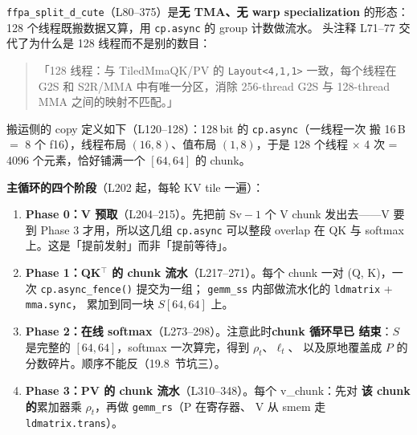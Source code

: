 \texttt{ffpa\_\allowbreak{}split\_\allowbreak{}d\_\allowbreak{}cute}（L80--375）是\textbf{无 TMA、无 warp specialization}
的形态：128 个线程既搬数据又算，用 \texttt{cp.async} 的 group 计数做流水。
头注释 L71--77 交代了为什么是 128 线程而不是别的数目：

\begin{quote}\small
「128 线程：与 TiledMmaQK/PV 的 \texttt{Layout\allowbreak{}<4,\allowbreak{}1,\allowbreak{}1>} 一致，每个线程在 G2S 和
S2R/MMA 中有唯一分区，消除 256-thread G2S 与 128-thread MMA 之间的映射不匹配。」
\end{quote}

搬运侧的 copy 定义如下（L120--128）：128\,bit 的 \texttt{cp.async}（一线程一次
搬 16\,B $=$ 8 个 f16），线程布局 $(16,8)$、值布局 $(1,8)$，于是 128 个线程
$\times$ 4 次 = 4096 个元素，恰好铺满一个 $[64,64]$ 的 chunk。



\textbf{主循环的四个阶段}（L202 起，每轮 KV tile 一遍）：

\begin{enumerate}[itemsep=2pt,topsep=2pt]
  \item \textbf{Phase 0：V 预取}（L204--215）。先把前 $\mathrm{Sv}-1$ 个 V chunk
        发出去——V 要到 Phase 3 才用，所以这几组 \texttt{cp.async} 可以整段
        overlap 在 QK 与 softmax 上。这是「提前发射」而非「提前等待」。
  \item \textbf{Phase 1：QK${}^\top$ 的 chunk 流水}（L217--271）。每个 chunk
        一对 (Q, K)，一次 \texttt{cp.\allowbreak{}async\_\allowbreak{}fence\allowbreak{}()} 提交为一组；
        \texttt{gemm\_ss} 内部做流水化的 \texttt{ldmatrix} + \texttt{mma.sync}，
        累加到同一块 $S[64,64]$ 上。
  \item \textbf{Phase 2：在线 softmax}（L273--298）。注意此时\textbf{chunk 循环早已
        结束}：$S$ 是完整的 $[64,64]$，softmax 一次算完，得到 $\rho_t$、$\ell_t$、
        以及原地覆盖成 $P$ 的分数碎片。顺序不能反（19.8~节坑三）。
  \item \textbf{Phase 3：PV 的 chunk 流水}（L310--348）。每个 v\_chunk：先对
        \textbf{该 chunk 的}累加器乘 $\rho_t$，再做 \texttt{gemm\_rs}（P 在寄存器、
        V 从 smem 走 \texttt{ldmatrix.\allowbreak{}trans}）。
\end{enumerate}



